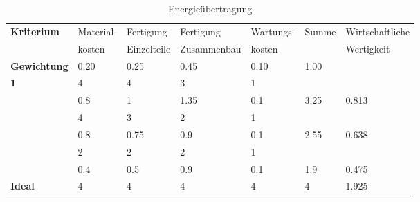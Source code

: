 \documentclass[10pt,a4paper]{article}
\begin{document}
\begin{table}[h!]
    \centering
    \hspace*{0in}
    \begin{tabular}{>{\bfseries}p{2cm} p{2.2cm} p{2cm} p{2cm} p{2.5cm} p{2cm} p{2cm}}
        \toprule
        Kriterium  & Material- & Fertigung   & Fertigung   & Wartungs- & Summe & Wirtschaftliche \\
                   & kosten    & Einzelteile & Zusammenbau & kosten    &       & Wertigkeit      \\
        \midrule
        Gewichtung & 0.20      & 0.25        & 0.45        & 0.10      & 1.00  &                 \\
        \midrule
        1          & 4         & 4           & 3           & 1         &       &                 \\
                   & 0.8       & 1           & 1.35        & 0.1       & 3.25  & 0.813           \\
        \addlinespace
        2          & 4         & 3           & 2           & 1         &       &                 \\
                   & 0.8       & 0.75        & 0.9         & 0.1       & 2.55  & 0.638           \\
        \addlinespace
        3          & 2         & 2           & 2           & 1         &       &                 \\
                   & 0.4       & 0.5         & 0.9         & 0.1       & 1.9   & 0.475           \\
        \addlinespace
        Ideal      & 4         & 4           & 4           & 4         & 4     & 1.925           \\
        \bottomrule
    \end{tabular}
    \caption{Energieübertragung}
    \label{tab:energieuebertragung}
\end{table}
\end{document}
